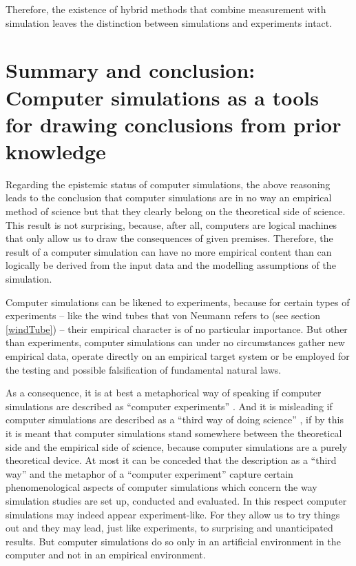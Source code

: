 \documentclass[onecollarge]{STJour}
\numberwithin{equation}{section}
\begin{document}
Therefore, the existence of hybrid methods that combine measurement with simulation leaves the distinction between simulations and experiments intact.


\section{Summary and conclusion: Computer simulations as a tools for drawing conclusions from prior knowledge}

Regarding the epistemic status of computer simulations, the above reasoning leads to the conclusion that computer simulations are in no way an empirical method of science but that they clearly belong on the theoretical side of science. This result is not surprising, because, after all, computers are logical machines that only allow us to draw the consequences of given premises. Therefore, the result of a computer simulation can have no more empirical content than can logically be derived from the input data and the modelling assumptions of the simulation. 

Computer simulations can be likened to experiments, because for certain types of experiments -- like the wind tubes that von Neumann refers to (see section \ref{windTube}) -- their empirical character is of no particular importance. But other than experiments, computer simulations can under no circumstances gather new empirical data, operate directly on an empirical target system or be employed for the testing and possible falsification of fundamental natural laws. 

As a consequence, it is at best a metaphorical way of speaking if computer simulations are described as ``computer experiments'' \citep{gramelsberger:2010}. And it is misleading if computer simulations are described as a ``third way of doing science'' \citep[p. 90]{axelrod:2003} \citep[p. 507]{rohrlich:1990} \citep{kueppers-lenhard:2005}, if by this it is meant that computer simulations stand somewhere between the theoretical side and the empirical side of science, because computer simulations are a purely theoretical device. At most it can be conceded that the description as a ``third way'' and the metaphor of a ``computer experiment'' capture certain phenomenological aspects of computer simulations which concern the way simulation studies are set up, conducted and evaluated. In this respect computer simulations may indeed appear experiment-like. For they allow us to try things out and they may lead, just like experiments, to surprising and unanticipated results. But computer simulations do so only in an artificial environment in the computer and not in an empirical environment. 
\end{document}
